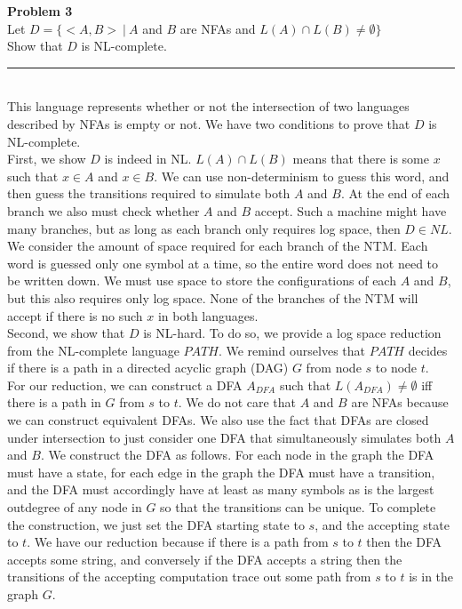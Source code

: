 \documentclass[paper=a4, fontsize=11pt]{scrartcl} %
\numberwithin{equation}{section} %
\numberwithin{figure}{section} %
\numberwithin{table}{section} %
\newcommand{\horrule}[1]{\rule{\linewidth}{#1}} %
\begin{document}
\newpage


\textbf{Problem 3}
\\

Let $D = \{<A,B> \ | \ A$ and $B$ are NFAs and $L(A) \cap L(B) \ne \emptyset \}$\\

Show that $D$ is NL-complete.

\horrule{1pt} 
\\

This language represents whether or not the intersection of two languages described by NFAs is empty or not.  We have two conditions to prove that $D$ is NL-complete.\\

First, we show $D$ is indeed in NL.  $L(A) \cap L(B)$ means that there is some $x$ such that $x \in A$ and $x \in B$.  We can use non-determinism to guess this word, and then guess the transitions required to simulate both $A$ and $B$.  At the end of each branch we also must check whether $A$ and $B$ accept.  Such a machine might have many branches, but as long as each branch only requires log space, then $D \in NL$.  We consider the amount of space required for each branch of the NTM.  Each word is guessed only one symbol at a time, so the entire word does not need to be written down.  We must use space to store the configurations of each $A$ and $B$, but this also requires only log space.  None of the branches of the NTM will accept if there is no such $x$ in both languages.\\

Second, we show that $D$ is NL-hard.  To do so, we provide a log space reduction from the NL-complete language $PATH$.  We remind ourselves that $PATH$ decides if there is a path in a directed acyclic graph (DAG) $G$ from node $s$ to node $t$.\\

For our reduction, we can construct a DFA $A_{DFA}$ such that $L(A_{DFA}) \ne \emptyset$ iff there is a path in  $G$ from $s$ to $t$. We do not care that $A$ and $B$ are NFAs because we can construct equivalent DFAs.  We also use the fact that DFAs are closed under intersection to just consider one DFA that simultaneously simulates both $A$ and $B$.  We construct the DFA as follows.  For each node in the graph the DFA must have a state, for each edge in the graph the DFA must have a transition, and the DFA must accordingly have at least as many symbols as is the largest outdegree of any node in $G$ so that the transitions can be unique.  To complete the construction, we just set the DFA starting state to $s$, and the accepting state to $t$.  We have our reduction because if there is a path from $s$ to $t$ then the DFA accepts some string, and conversely if the DFA accepts a string then the transitions of the accepting computation trace out some path from $s$ to $t$ is in the graph $G$.  
\end{document}
